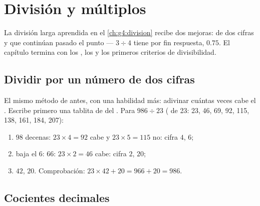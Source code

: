 \chapter{División y múltiplos}\label{ch:g5:division}

La división larga aprendida en el \cref{ch:g4:division} recibe dos mejoras:
 de dos cifras y  que continúan pasado el punto ---
$3 \div 4$ tiene por fin respuesta, $0.75$. El capítulo termina con los
, los  y los primeros criterios de divisibilidad.

\section{Dividir por un número de dos cifras}

\begin{method}\label{met:g5:division:twodigits}
El mismo método de antes, con una habilidad más: adivinar cuántas veces
cabe el . Escribe primero una tablita de  del .
Para $986 \div 23$ ( de 23: 23, 46, 69, 92, 115,
138, 161, 184, 207):
\begin{enumerate}
  \item $98$ decenas: $23 \times 4 = 92$ cabe y $23 \times 5 = 115$ no:
        cifra $4$,  $6$;
  \item baja el $6$: $66$: $23 \times 2 = 46$ cabe: cifra
        $2$,  $20$;
  \item {} $42$,  $20$. Comprobación:
        $23 \times 42 + 20 = 966 + 20 = 986$.
\end{enumerate}
\end{method}

\section{Cocientes decimales}

